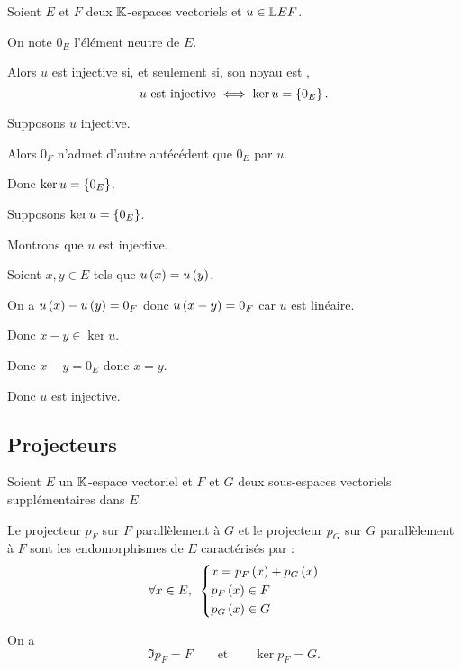 \begin{theo}
Soient \(E\) et \(F\) deux \(\mathbb{K}\)-espaces vectoriels et \(u\in\mathbb{L}{E}{F}\).

On note \(0_E\) l'élément neutre de \(E\).

Alors \(u\) est injective si, et seulement si, son noyau est , \cad \[u\text{ est injective}\iff\ker u=\left\lbrace0_E\right\rbrace.\]
\end{theo}

\begin{dem}
\impdir

Supposons \(u\) injective.

Alors \(0_F\) n'admet d'autre antécédent que \(0_E\) par \(u\).

Donc \(\ker u=\left\lbrace0_E\right\rbrace\).

\imprec

Supposons \(\ker u=\left\lbrace0_E\right\rbrace\).

Montrons que \(u\) est injective.

Soient \(x,y\in E\) tels que \(u\left(x\right)=u\left(y\right)\).

On a \(u\left(x\right)-u\left(y\right)=0_F\) donc \(u\left(x-y\right)=0_F\) car \(u\) est linéaire.

Donc \(x-y\in\ker u\).

Donc \(x-y=0_E\) donc \(x=y\).

Donc \(u\) est injective.
\end{dem}

\subsection{Projecteurs}

\begin{defprop}
Soient \(E\) un \(\mathbb{K}\)-espace vectoriel et \(F\) et \(G\) deux sous-espaces vectoriels supplémentaires dans \(E\).

Le projecteur \(p_F\) sur \(F\) parallèlement à \(G\) et le projecteur \(p_G\) sur \(G\) parallèlement à \(F\) sont les endomorphismes de \(E\) caractérisés par : \[\quantifs{\forall x\in E}\begin{dcases}
x=p_F\paren{x}+p_G\paren{x} \\
p_F\paren{x}\in F \\
p_G\paren{x}\in G
\end{dcases}\]

On a \[\Im p_F=F\qquad\text{et}\qquad\ker p_F=G.\]
\end{defprop}

